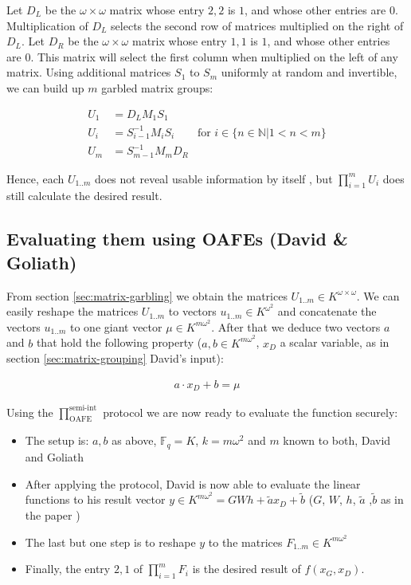 \documentclass[12pt, a4paper]{article}
\begin{document}
Let $D_L$ be the $\omega \times \omega$ matrix whose entry $2,2$ is $1$, and
whose other entries are $0$. Multiplication of $D_L$ selects the second row of
matrices multiplied on the right of $D_L$. Let $D_R$ be the $\omega \times
\omega$ matrix whose entry $1,1$ is $1$, and whose other entries are $0$. This
matrix will select the first column when multiplied on the left of any matrix.
Using additional matrices $S_1$ to $S_{m}$ uniformly at random and invertible,
we can build up $m$ garbled matrix groups:

\begin{align*}
U_1 & = D_L M_1 S_1 \\
U_i & = S_{i-1}^{-1} M_i S_i &
\text{for $i \in \{n \in \mathbb{N} \big| 1 < n < m\}$}\\
U_m & = S_{m-1}^{-1} M_m D_R
\end{align*}

\noindent{} Hence, each $U_{1..m}$ does not reveal usable information by itself
\cite{cramer03}, but $\prod_{i=1}^m U_i$ does still calculate the desired
result.


\subsection{Evaluating them using OAFEs (David \& Goliath)}

From section \ref{sec:matrix-garbling} we obtain the matrices $U_{1..m} \in
K^{\omega \times \omega}$. We can easily reshape the matrices $U_{1..m}$ to
vectors $u_{1..m} \in K^{\omega^2}$ and concatenate the vectors $u_{1..m}$ to
one giant vector $\mu \in K^{m\omega^2}$. After that we deduce two vectors $a$
and $b$ that hold the following property ($a, b \in K^{m\omega^2}$, $x_D$ a
scalar variable, as in section \ref{sec:matrix-grouping} David's input):

\begin{align}
a \cdot x_D + b = \mu
\end{align}

Using the $\prod^{\text{semi-int}}_{\text{OAFE}}$ protocol\cite{davidgoliath} we
are now ready to evaluate the function securely:

\begin{itemize}

\item The setup is: $a, b$ as above, $\mathbb{F}_q = K$, $k = m\omega^2$ and $m$
known to both, David and Goliath

\item After applying the protocol, David is now able to evaluate the linear
functions to his result vector $y \in K^{m\omega^2} = GWh + \tilde{a}x_D +
\tilde{b}$ ($G$, $W$, $h$, $\tilde{a}$ ,$\tilde{b}$ as in the paper
\cite{davidgoliath})

\item The last but one step is to reshape $y$ to the matrices $F_{1..m}
\in K^{m\omega^2}$

\item Finally, the entry $2, 1$ of $\prod_{i=1}^m F_i$ is the desired result of
$f(x_G,x_D)$.

\end{itemize}


\end{document}
